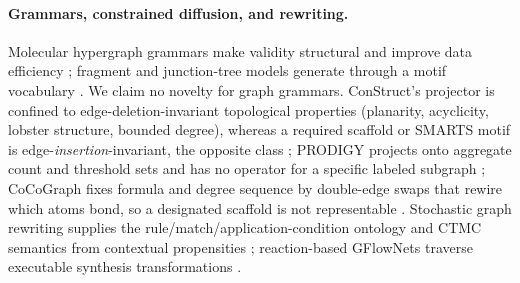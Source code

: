 \documentclass{article}
\theoremstyle{definition}
\theoremstyle{remark}
\begin{document}
\paragraph{Grammars, constrained diffusion, and rewriting.}
Molecular hypergraph grammars make validity structural and improve data efficiency \citep{kajino2019mhg,guo2022grammar}; fragment and junction-tree models generate through a motif vocabulary \citep{jin2018jtvae}. We claim no novelty for graph grammars. ConStruct's projector is confined to edge-deletion-invariant topological properties (planarity, acyclicity, lobster structure, bounded degree), whereas a required scaffold or SMARTS motif is edge-\emph{insertion}-invariant, the opposite class \citep{madeira2024construct}; PRODIGY projects onto aggregate count and threshold sets and has no operator for a specific labeled subgraph \citep{sharma2024prodigy}; CoCoGraph fixes formula and degree sequence by double-edge swaps that rewire which atoms bond, so a designated scaffold is not representable \citep{ruizbotella2026cocograph}. Stochastic graph rewriting supplies the rule/match/application-condition ontology and CTMC semantics from contextual propensities \citep{danos2015thermodynamic,behr2021rewriting}; reaction-based GFlowNets traverse executable synthesis transformations \citep{koziarski2024rgfn,zhu2026spacegfn}.
\end{document}
